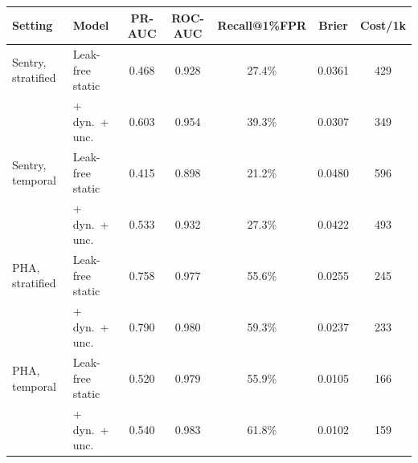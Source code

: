 \begin{tabular}{llccccc}
\toprule
Setting & Model & PR-AUC & ROC-AUC & Recall@1\%FPR & Brier & Cost/1k\\
\midrule
Sentry, stratified & Leak-free static & 0.468 & 0.928 & 27.4\% & 0.0361 & 429\\
 & + dyn.\ + unc. & 0.603 & 0.954 & 39.3\% & 0.0307 & 349\\
\midrule
Sentry, temporal & Leak-free static & 0.415 & 0.898 & 21.2\% & 0.0480 & 596\\
 & + dyn.\ + unc. & 0.533 & 0.932 & 27.3\% & 0.0422 & 493\\
\midrule
PHA, stratified & Leak-free static & 0.758 & 0.977 & 55.6\% & 0.0255 & 245\\
 & + dyn.\ + unc. & 0.790 & 0.980 & 59.3\% & 0.0237 & 233\\
\midrule
PHA, temporal & Leak-free static & 0.520 & 0.979 & 55.9\% & 0.0105 & 166\\
 & + dyn.\ + unc. & 0.540 & 0.983 & 61.8\% & 0.0102 & 159\\
\bottomrule
\end{tabular}
